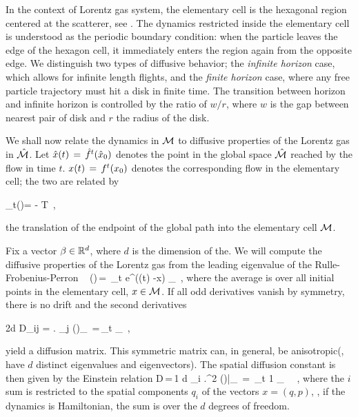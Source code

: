 \documentclass[aps,pre,
                showpacs,
                twocolumn,
                groupedaddress,
                floatfix]{revtex4-1}
\begin{document}
In the context of Lorentz gas system, the elementary cell is the hexagonal region centered at the scatterer, see . The dynamics restricted inside the elementary cell is understood as the periodic boundary condition: when the particle leaves the edge of the hexagon cell, it immediately enters the region again from the opposite edge. We distinguish two types of diffusive behavior; the {\em infinite horizon} case, which allows for infinite length flights, and the {\em finite horizon} case, where any free particle trajectory must hit a disk in finite time. The transition between horizon and infinite horizon is controlled by the ratio of $w/r$, where $w$ is the gap between nearest pair of disk and $r$ the radius of the disk.

We shall now relate the dynamics in ${\cal M}$ to diffusive properties of the Lorentz gas in $\hat {{\cal M}}$. Let $\hat x(t)\,=\,{\hat{f}^{t}(\hat x_0)}$ denotes the point in the global space $\hat {{\cal M}}$ reached by the flow in time $t$. $x(t)\,=\,{f^{t}({x_0})}$ denotes the corresponding flow in the elementary cell; the two are related by

\beq
\hn_t(\xInit)= -  \in T \,,

the translation of the endpoint of the global path into the elementary cell $\pS$.

Fix a vector $\beta \in \reals^d$, where $d$ is the dimension of the{\statesp}. We will compute the diffusive properties of the Lorentz gas from the leading eigenvalue of the Rulle-Frobenius-Perron \evOper\
\beq
\eigenvL(\beta)\,=\, \lim_{t \rightarrow \infty}  \log \langle
e^{\beta \cdot (\hx(t) -x) } \rangle_\pS ~, \quad
\label{eq-diff-1}
\eeq
where the average is over all initial points in the elementary cell, $x \in{\cal M}$. If all odd derivatives vanish by symmetry, there is no drift and the second derivatives
\begin{widetext}
\beq
2d D_{ij} = \left . {} {\frac{\partial} 
{\partial \beta_j}} \eigenvL(\beta)\right\vert_{\beta=0} \,=\,\lim_{t\rightarrow
\infty} {\frac{1}{t}} \langle {(\hx(t) -x)_i (\hx(t) -x)_j } \rangle_\pS ~,
\eeq
\end{widetext}
yield a diffusion matrix.  This symmetric matrix can, in general, be anisotropic(\ie, have $d$ distinct eigenvalues and eigen\-vectors). The spatial diffusion constant is then given by the Einstein relation
\beq
D\,=\,{1 d} \sum_i \left .{{\partial}^2 } \eigenvL(\beta)\right |_{} \,=\,
\lim_{t\rightarrow \infty} {1} 
\rangle_\pS~ ~,
\eeq
where the $i$ sum is restricted to the spatial components $q_i$ of the{\statesp} vectors $x=(q,p)$, \ie, if the dynamics is Hamiltonian, the sum is over the $d$ degrees of freedom.
\end{document}

